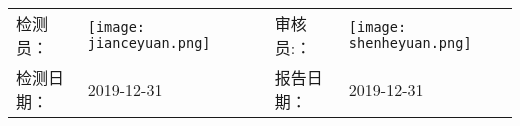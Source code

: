 \vspace*{1cm}
\begin{longtable}{m{2cm}m{3.5cm}m{3cm}m{2cm}m{3.5cm}}
检测员：&\texttt{[image: jianceyuan.png]}&&审核员:：&\texttt{[image: shenheyuan.png]}\\
检测日期：&2019-12-31&&报告日期：& 2019-12-31\\
\end{longtable}



